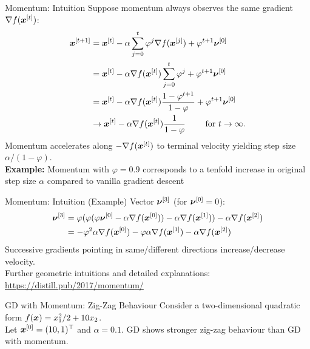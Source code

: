 \documentclass[11pt,compress,t,notes=noshow, xcolor=table]{beamer}
\begin{document}
\begin{framev}[fs=footnotesize]{Momentum: Intuition}
Suppose momentum always observes the same gradient $\nabla f(\bm{x}^{[t]})$:
\begin{align*}
\bm{x}^{[t+1]} &= \bm{x}^{[t]} - \alpha \displaystyle\sum_{j = 0}^{t} \varphi^j  \nabla f(\bm{x}^{[j]}) + \varphi^{t+1}\bm{\nu}^{[0]} \\
&= \bm{x}^{[t]} - \alpha  \nabla f(\bm{x}^{[t]}) \displaystyle\sum_{j = 0}^{t} \varphi^j + \varphi^{t+1}\bm{\nu}^{[0]} \\
&= \bm{x}^{[t]} - \alpha  \nabla f(\bm{x}^{[t]}) \frac{1 - \varphi^{t+1}}{1 - \varphi} + \varphi^{t+1} \bm{\nu}^{[0]} \\
&\to \bm{x}^{[t]} - \alpha  \nabla f(\bm{x}^{[t]}) \frac{1}{1 - \varphi} \qquad \text{ for } t \to \infty.
\end{align*}
Momentum accelerates along $- \nabla f(\bm{x}^{[t]})$ to terminal velocity yielding step size $\alpha / (1 - \varphi)$.\\
\spacer
\textbf{Example:} Momentum with $\varphi = 0.9$ corresponds to a tenfold increase in original step size $\alpha$ compared to vanilla gradient descent
\end{framev}


\begin{framev}[fs=footnotesize]{Momentum: Intuition (Example)}
Vector $\bm{\nu}^{[3]}$ (for $\bm{\nu}^{[0]} = 0$):
\begin{align*}
\bm{\nu}^{[3]} &= \varphi (\varphi (\varphi \bm{\nu}^{[0]} - \alpha \nabla f(\bm{x}^{[0]})) - \alpha \nabla f(\bm{x}^{[1]})) - \alpha \nabla f(\bm{x}^{[2]}) \\
&= - \varphi^2\alpha\nabla f(\bm{x}^{[0]}) - \varphi \alpha \nabla f(\bm{x}^{[1]}) - \alpha \nabla f(\bm{x}^{[2]})
\end{align*}
\spacer
Successive gradients pointing in same/different directions increase/decrease velocity.\\
Further geometric intuitions and detailed explanations: \url{https://distill.pub/2017/momentum/}
\end{framev}


\begin{framev}{GD with Momentum: Zig-Zag Behaviour}
Consider a two-dimensional quadratic form $f(\bm{x}) = x_1^2/2 + 10 x_2$.\\
\vfill
Let $\bm{x}^{[0]} = (10, 1)^\top$ and $\alpha = 0.1$.
\footnotesize GD shows stronger zig-zag behaviour than GD with momentum.
\end{framev}
\end{document}
